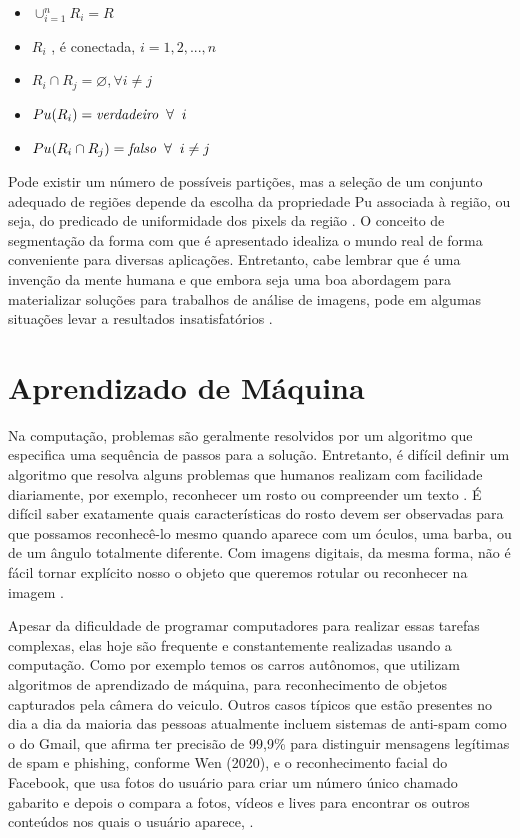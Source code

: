 \documentclass[openright]{UFRGS} %
\begin{document}
\begin{itemize}
  \item $ \cup_{\textit{i}=1}^n R_{i} = R   $
  \item $ R_{i}$ , é conectada, $i =1,2,...,n $
  \item $ R_{i} \cap{} R_{j} = \varnothing, \forall i \neq j $
  \item $ Pu(R_{i})= \textit{verdadeiro} \hspace{0.2cm} \forall \hspace{0.2cm} i $
  \item $ Pu(R_{i}  \cap{}  R_{j})= \textit{falso} \hspace{0.2cm} \forall \hspace{0.2cm} i  \neq j$
\end{itemize}


Pode existir um número de possíveis partições, mas a seleção de um conjunto adequado
de regiões depende da escolha da propriedade Pu associada à região, ou seja, do
predicado de uniformidade dos pixels da região \cite{pavlidis2013structural}. O conceito de segmentação da forma com que é apresentado idealiza o mundo real de
forma conveniente para diversas aplicações. Entretanto, cabe lembrar que é uma
invenção da mente humana e que embora seja uma boa abordagem para materializar
soluções para trabalhos de análise de imagens, pode em algumas situações levar a
resultados insatisfatórios \cite{davies2004machine}. 



\section{Aprendizado de Máquina}

Na computação, problemas são geralmente resolvidos por um algoritmo que especifica uma sequência de passos para a solução. Entretanto, é difícil definir um algoritmo que resolva alguns problemas que humanos realizam com facilidade diariamente, por exemplo, reconhecer um rosto ou compreender um texto \cite{watkins2001structural}. É difícil saber exatamente quais características do rosto devem ser observadas para que possamos reconhecê-lo mesmo quando aparece com um óculos, uma barba, ou de um ângulo totalmente diferente. Com imagens digitais, da mesma forma, não é fácil tornar explícito nosso o objeto que queremos rotular ou reconhecer na imagem \cite{watkins2001structural}.

Apesar da dificuldade de programar computadores para realizar essas tarefas complexas, elas hoje são frequente e constantemente realizadas usando a computação. Como por exemplo temos os carros autônomos, que utilizam algoritmos de aprendizado de máquina, para reconhecimento de objetos capturados pela câmera do veiculo. Outros casos
típicos que estão presentes no dia a dia da maioria das pessoas atualmente incluem sistemas de anti-spam como o do Gmail, que afirma ter precisão de 99,9\% para distinguir mensagens legítimas de spam e phishing, conforme Wen (2020), e o reconhecimento facial do Facebook, que usa fotos do usuário para criar um número único chamado gabarito e depois o compara a fotos, vídeos e lives para encontrar os outros conteúdos nos quais o usuário aparece, \cite{bachrach2012personality} .
\end{document}
